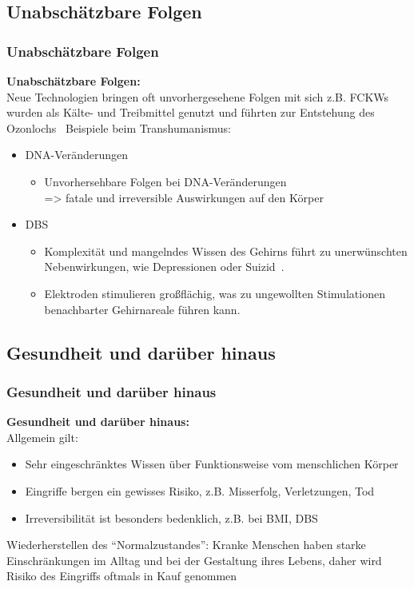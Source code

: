 \documentclass[aspectratio=169,16pt,xcolor=table]{beamer}
\begin{document}
\subsection{Unabschätzbare Folgen}
\begin{frame}
  \frametitle{Unabschätzbare Folgen}
  \textbf{Unabschätzbare Folgen:}\\
  \small Neue Technologien bringen oft unvorhergesehene Folgen mit sich z.B. FCKWs wurden als Kälte- und Treibmittel genutzt und führten zur Entstehung des Ozonlochs~\cite{rowland1996stratospheric}
  Beispiele beim Transhumanismus:
  \begin{itemize}
    \item DNA-Veränderungen
    \begin{itemize}
      \item Unvorhersehbare Folgen bei DNA-Veränderungen\\
      => fatale und irreversible Auswirkungen auf den Körper
    \end{itemize}
    \item DBS
    \begin{itemize}
      \item Komplexität und mangelndes Wissen des Gehirns führt zu unerwünschten Nebenwirkungen, wie Depressionen oder Suizid~\cite{zarzycki2020stimulation}.
      \item Elektroden stimulieren großflächig, was zu ungewollten Stimulationen benachbarter Gehirnareale führen kann.
    \end{itemize}
  \end{itemize}
\end{frame}

\subsection{Gesundheit und darüber hinaus}
\begin{frame}
  \frametitle{Gesundheit und darüber hinaus}
  \textbf{Gesundheit und darüber hinaus:}\\
  Allgemein gilt:
  \begin{itemize}
      \item Sehr eingeschränktes Wissen über Funktionsweise vom menschlichen Körper
      \item Eingriffe bergen ein gewisses Risiko, z.B. Misserfolg, Verletzungen, Tod
      \item Irreversibilität ist besonders bedenklich, z.B. bei BMI, DBS
  \end{itemize}
  Wiederherstellen des ``Normalzustandes'':
  Kranke Menschen haben starke Einschränkungen im Alltag und bei der Gestaltung ihres Lebens, daher wird Risiko des Eingriffs oftmals in Kauf genommen
\end{frame}
\end{document}
